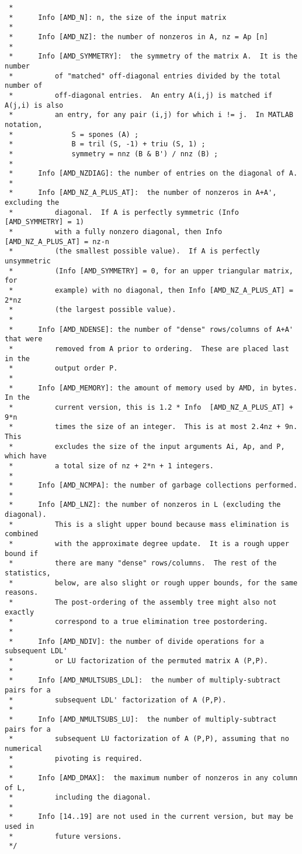 \documentclass[11pt]{article}
\begin{document}
{\begin{verbatim}
 *
 *      Info [AMD_N]: n, the size of the input matrix
 *
 *      Info [AMD_NZ]: the number of nonzeros in A, nz = Ap [n]
 *
 *      Info [AMD_SYMMETRY]:  the symmetry of the matrix A.  It is the number
 *          of "matched" off-diagonal entries divided by the total number of
 *          off-diagonal entries.  An entry A(i,j) is matched if A(j,i) is also
 *          an entry, for any pair (i,j) for which i != j.  In MATLAB notation,
 *              S = spones (A) ;
 *              B = tril (S, -1) + triu (S, 1) ;
 *              symmetry = nnz (B & B') / nnz (B) ;
 *
 *      Info [AMD_NZDIAG]: the number of entries on the diagonal of A.
 *
 *      Info [AMD_NZ_A_PLUS_AT]:  the number of nonzeros in A+A', excluding the
 *          diagonal.  If A is perfectly symmetric (Info [AMD_SYMMETRY] = 1)
 *          with a fully nonzero diagonal, then Info [AMD_NZ_A_PLUS_AT] = nz-n
 *          (the smallest possible value).  If A is perfectly unsymmetric
 *          (Info [AMD_SYMMETRY] = 0, for an upper triangular matrix, for
 *          example) with no diagonal, then Info [AMD_NZ_A_PLUS_AT] = 2*nz
 *          (the largest possible value).
 *
 *      Info [AMD_NDENSE]: the number of "dense" rows/columns of A+A' that were
 *          removed from A prior to ordering.  These are placed last in the
 *          output order P.
 *
 *      Info [AMD_MEMORY]: the amount of memory used by AMD, in bytes.  In the
 *          current version, this is 1.2 * Info  [AMD_NZ_A_PLUS_AT] + 9*n
 *          times the size of an integer.  This is at most 2.4nz + 9n.  This
 *          excludes the size of the input arguments Ai, Ap, and P, which have
 *          a total size of nz + 2*n + 1 integers.
 *
 *      Info [AMD_NCMPA]: the number of garbage collections performed.
 *
 *      Info [AMD_LNZ]: the number of nonzeros in L (excluding the diagonal).
 *          This is a slight upper bound because mass elimination is combined
 *          with the approximate degree update.  It is a rough upper bound if
 *          there are many "dense" rows/columns.  The rest of the statistics,
 *          below, are also slight or rough upper bounds, for the same reasons.
 *          The post-ordering of the assembly tree might also not exactly
 *          correspond to a true elimination tree postordering.
 *
 *      Info [AMD_NDIV]: the number of divide operations for a subsequent LDL'
 *          or LU factorization of the permuted matrix A (P,P).
 *
 *      Info [AMD_NMULTSUBS_LDL]:  the number of multiply-subtract pairs for a
 *          subsequent LDL' factorization of A (P,P).
 *
 *      Info [AMD_NMULTSUBS_LU]:  the number of multiply-subtract pairs for a
 *          subsequent LU factorization of A (P,P), assuming that no numerical
 *          pivoting is required.
 *
 *      Info [AMD_DMAX]:  the maximum number of nonzeros in any column of L,
 *          including the diagonal.
 *
 *      Info [14..19] are not used in the current version, but may be used in
 *          future versions.
 */    


\end{verbatim}}
\end{document}
